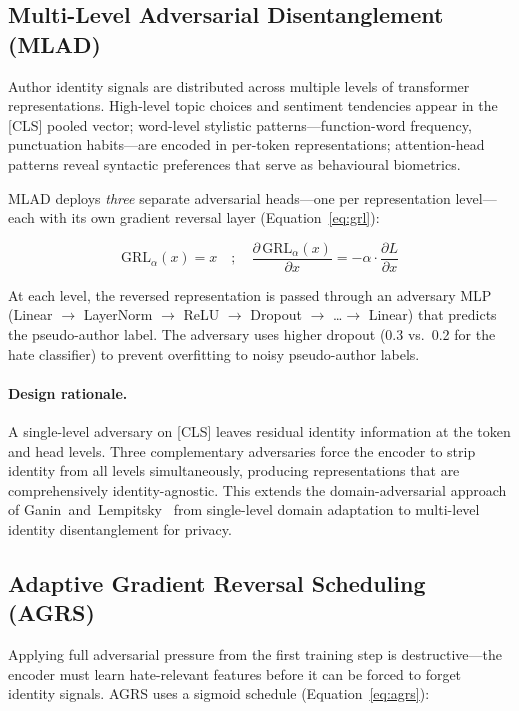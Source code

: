\documentclass{article}
\begin{document}
\subsection{Multi-Level Adversarial Disentanglement (MLAD)}

Author identity signals are distributed across multiple levels of
transformer representations. High-level topic choices and sentiment
tendencies appear in the [CLS] pooled vector; word-level stylistic
patterns---function-word frequency, punctuation habits---are encoded in
per-token representations; attention-head patterns reveal syntactic
preferences that serve as behavioural biometrics.

MLAD deploys \emph{three} separate adversarial heads---one per
representation level---each with its own gradient reversal layer
(Equation~\ref{eq:grl}):

\begin{equation}
\label{eq:grl}
\text{GRL}_{\alpha}(x) = x \quad;\quad
\frac{\partial\,\text{GRL}_{\alpha}(x)}{\partial x} = -\alpha \cdot \frac{\partial L}{\partial x}
\end{equation}

At each level, the reversed representation is passed through an
adversary MLP (Linear $\to$ LayerNorm $\to$ ReLU $\to$ Dropout
$\to$ \dots $\to$ Linear) that predicts the pseudo-author label.
The adversary uses higher dropout (0.3 vs.\ 0.2 for the hate
classifier) to prevent overfitting to noisy pseudo-author labels.

\paragraph{Design rationale.}
A single-level adversary on [CLS] leaves residual identity information
at the token and head levels. Three complementary adversaries force the
encoder to strip identity from all levels simultaneously, producing
representations that are comprehensively identity-agnostic.
This extends the domain-adversarial approach of
Ganin~and~Lempitsky~\cite{ganin2015unsupervised} from single-level
domain adaptation to multi-level identity disentanglement for privacy.

\subsection{Adaptive Gradient Reversal Scheduling (AGRS)}

Applying full adversarial pressure from the first training step is
destructive---the encoder must learn hate-relevant features before it
can be forced to forget identity signals. AGRS uses a sigmoid schedule
(Equation~\ref{eq:agrs}):
\end{document}
